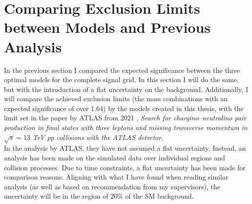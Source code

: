 \section{Comparing Exclusion Limits between Models and Previous Analysis}
In the previous section I compared the expected significance between 
the three optimal models for the complete signal grid. In this section 
I will do the same, but with the introduction of a flat uncertainty on the background.
Additionally, I will compare the achieved exclusion limits (the mass combinations with an expected 
significance of over 1.64) by the models created in this thesis, with the limit set in the paper by \ac{ATLAS} 
from 2021 \cite{atlas_search_2021}, \emph{Search for chargino--neutralino pair production in final states with 
three leptons and missing transverse momentum in} $\sqrt{s}=13$ \emph{TeV pp collisions with the \ac{ATLAS} detector}.
\\
In the analysis by \ac{ATLAS}, they have not assumed a flat uncertainty. Instead, an analysis has been made on the simulated data 
over individual regions and collision processes. Due to time constraints, a flat uncertainty has been made for comparison 
reasons. Aligning with what I have found when reading similar analysis (as well as based on recommendation from my supervisors), 
the uncertainty will be in the region of $20\%$ of the \ac{SM} background.\\
